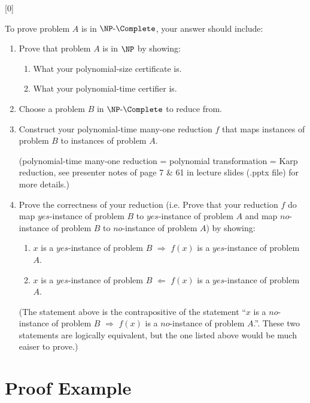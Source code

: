 [0]

To prove problem $A$ is in $\NP \text{-} \Complete$, your answer should include:
\begin{enumerate}

  \item Prove that problem $A$ is in $\NP$ by showing:
  \begin{enumerate}
      \item What your {\color{red} polynomial-size} certificate is.
      \item What your {\color{red} polynomial-time} certifier is.
  \end{enumerate}

  \item Choose a problem $B$ in $\NP \text{-} \Complete$ to reduce from.
  
  \item Construct your {\color{red} polynomial-time many-one reduction} $f$ that maps instances of problem $B$ to instances of problem $A$. 
  
  (polynomial-time many-one reduction = polynomial transformation = Karp reduction, see presenter notes of page 7 \& 61 in lecture slides (.pptx file) for more details.) 

  \item Prove the correctness of your reduction (i.e. Prove that your reduction $f$ do map $yes$-instance of problem $B$ to $yes$-instance of problem $A$ and map $no$-instance of problem $B$ to $no$-instance of problem $A$) by showing:
  \begin{enumerate}
      \item $x$ is a $yes$-instance of problem $B$ $\Rightarrow$ $f(x)$ is a $yes$-instance of problem $A$.
      \item $x$ is a $yes$-instance of problem $B$ $\Leftarrow$ $f(x)$ is a $yes$-instance of problem $A$.
  \end{enumerate}
  (The statement above is the contrapositive of the statement ``$x$ is a $no$-instance of problem $B$ $\Rightarrow$ $f(x)$ is a $no$-instance of problem $A$.''. These two statements are logically equivalent, but the one listed above would be much eaiser to prove.)
\end{enumerate}


\section*{Proof Example}

